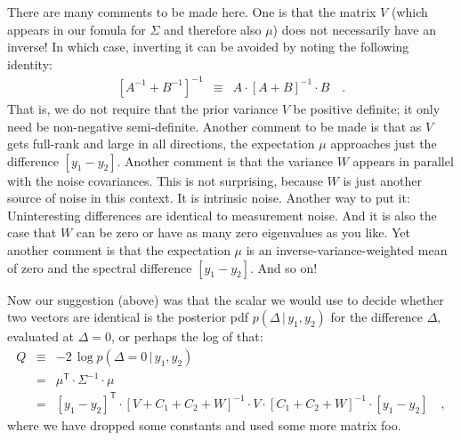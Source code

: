 \documentclass[12pt,letterpaper]{article}
\newcommand{\tra}[1]{{#1}^{\mathsf{T}}}
\newcommand{\inv}[1]{{#1}^{-1}}
\newcommand{\given}{\,|\,}
\begin{document}
There are many comments to be made here. One is that the matrix $V$
(which appears in our fomula for $\Sigma$ and therefore also $\mu$)
does not necessarily have an inverse! In which case, inverting it can
be avoided by noting the following identity:
\begin{eqnarray}
  \inv{[\inv{A} + \inv{B}]} &\equiv& A\cdot\inv{[A + B]}\cdot B
\quad .
\end{eqnarray}
That is, we do not require that the prior variance $V$ be positive
definite; it only need be non-negative semi-definite.
Another comment to be made is that as $V$ gets full-rank and large
in all directions, the expectation $\mu$ approaches just the difference
$[y_1-y_2]$.
Another comment is that the variance $W$ appears in parallel with the
noise covariances. This is not surprising, because $W$ is just another
source of noise in this context. It is intrinsic noise. Another way
to put it: Uninteresting differences are identical to measurement noise.
And it is also the case that $W$ can be zero or have as many zero
eigenvalues as you like.
Yet another comment is that the expectation $\mu$ is an inverse-variance-weighted
mean of zero and the spectral difference $[y_1-y_2]$. And so on!

Now our suggestion (above) was that the scalar we would use to decide
whether two vectors are identical is the posterior pdf $p(\Delta\given
y_1,y_2)$ for the difference $\Delta$, evaluated at $\Delta=0$, or
perhaps the log of that:
\begin{eqnarray}
  Q &\equiv& -2\,\log p(\Delta=0\given y_1,y_2)
\\
    &=& \tra{\mu}\cdot\inv{\Sigma}\cdot\mu
\\
    &=& \tra{[y_1-y_2]}\cdot\inv{[V + C_1 + C_2 + W]}\cdot V\cdot\inv{[C_1 + C_2 + W]}\cdot[y_1-y_2]
\quad ,
\end{eqnarray}
where we have dropped some constants and used some more matrix foo.
\end{document}
